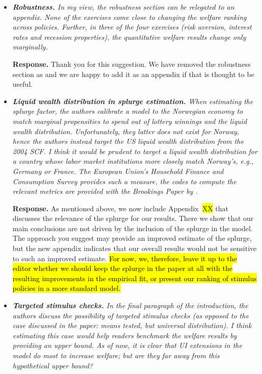 \documentclass[12pt,letterpaper,english]{article}
\begin{document}
\begin{itemize}
	\item \textit{\textbf{Robustness.} In my view, the robustness section can be relegated to an appendix. None of the exercises come close to changing the welfare ranking across policies. Further, in three of the four exercises
		(risk aversion, interest rates and recession properties), the quantitative welfare results change only marginally.}
	
	\noindent \textbf{Response.} Thank you for this suggestion. We have removed the robustness section as and we are happy to add it as an appendix if that is thought to be useful.
	
	\item \textit{\textbf{Liquid wealth distribution in splurge estimation.} When estimating the splurge factor, the authors calibrate a model to the Norwegian economy to match marginal propensities to spend out of lottery winnings and the liquid wealth distribution. Unfortunately, they latter does not exist for Norway, hence the authors instead target the US liquid wealth distribution from the 2004 SCF. I think it would be prudent to target a liquid wealth distribution for a country whose labor market institutions more closely match Norway’s, e.g., Germany or France. The European Union’s Household Finance and Consumption Survey provides such a measure, the codes to compute the relevant metrics are provided with the Brookings Paper by \citet{kaplan2014wealthy}.}
	
	\noindent \textbf{Response.} As mentioned above, we now include Appendix~\colorbox{yellow}{XX} that discusses the relevance of the splurge for our results. There we show that our main conclusions are not driven by the inclusion of the splurge in the model. The approach you suggest may provide an improved estimate of the splurge, but the new appendix indicates that our overall results would not be sensitive to such an improved estimate. \hl{For now, we, therefore, leave it up to the editor whether we should keep the splurge in the paper at all with the resulting improvements in the empirical fit, or present our ranking of stimulus policies in a more standard model.}
	
	\item \textit{\textbf{Targeted stimulus checks.} In the final paragraph of the introduction, the authors discuss the possibility of targeted stimulus checks (as opposed to the case discussed in the paper: means tested, but universal distribution). I think estimating this case would help readers benchmark the welfare results by providing an upper bound. As of now, it is clear that UI extensions in the model do most to increase welfare; but are they far away from this hypothetical upper bound?}
	

\end{itemize}
\end{document}
